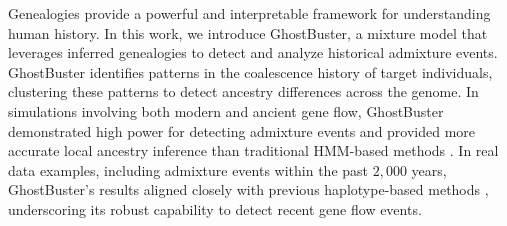 


Genealogies provide a powerful and interpretable framework for understanding human history. In this work, we introduce GhostBuster, a mixture model that leverages inferred genealogies to detect and analyze historical admixture events. GhostBuster identifies patterns in the coalescence history of target individuals, clustering these patterns to detect ancestry differences across the genome. In simulations involving both modern and ancient gene flow, GhostBuster demonstrated high power for detecting admixture events and provided more accurate local ancestry inference than traditional HMM-based methods \cite{skov2018detecting}. In real data examples, including admixture events within the past $2{,}000$ years, GhostBuster’s results aligned closely with previous haplotype-based methods \cite{salter2019fine}, underscoring its robust capability to detect recent gene flow events.

